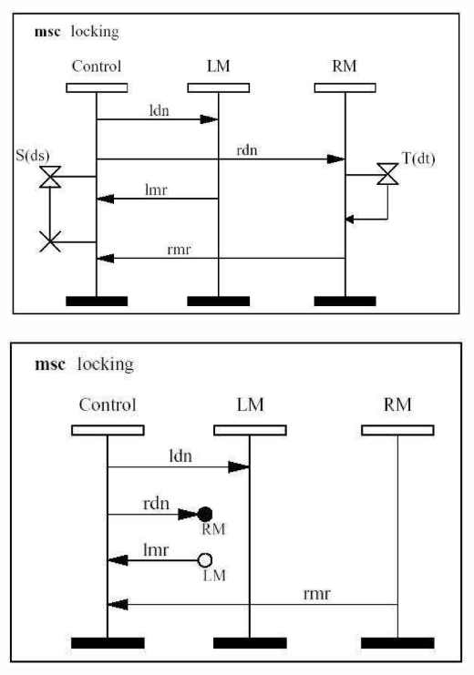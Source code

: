 \documentclass[]{article}
\begin{document}
\begin{center}
	\includegraphics[scale=0.4]{TimTim.png}
\end{center}

\begin{center}
	\includegraphics[scale=0.4]{MsgPerdEnc.png}
\end{center}
\end{document}
